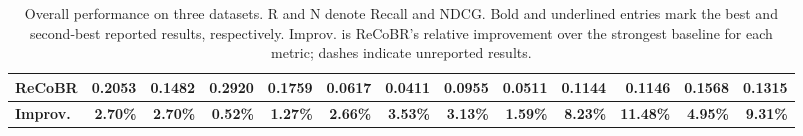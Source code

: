 \documentclass[letterpaper]{article}
\begin{document}
\begin{table}[t]
{\begin{tabular}{lrrrrrrrrrrrr}
        \textbf{ReCoBR}
        & \textbf{0.2053}
        & \textbf{0.1482}
        & \textbf{0.2920}
        & \textbf{0.1759}
        & \textbf{0.0617}
        & \textbf{0.0411}
        & \textbf{0.0955}
        & \textbf{0.0511}
        & \textbf{0.1144}
        & \textbf{0.1146}
        & \textbf{0.1568}
        & \textbf{0.1315} \\

        \midrule
        \textbf{Improv.}
        & \textbf{2.70\%}
        & \textbf{2.70\%}
        & \textbf{0.52\%}
        & \textbf{1.27\%}
        & \textbf{2.66\%}
        & \textbf{3.53\%}
        & \textbf{3.13\%}
        & \textbf{1.59\%}
        & \textbf{8.23\%}
        & \textbf{11.48\%}
        & \textbf{4.95\%}
        & \textbf{9.31\%} \\
        \bottomrule
    \end{tabular}
    }

    \caption{Overall performance on three datasets. R and N denote
    Recall and NDCG. Bold and underlined entries mark the best
    and second-best reported results, respectively. Improv. is
    ReCoBR's relative improvement over the strongest baseline for
    each metric; dashes indicate unreported results.}
    \label{tab:overall}
\end{table}
\end{document}
